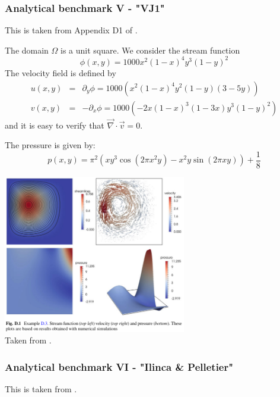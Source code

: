 \subsubsection{Analytical benchmark V \label{mms5} - "VJ1"}

This is taken from Appendix D1 of \cite{john16}.

The domain $\Omega$ is a unit square. We consider the stream function
\[
\phi(x,y)=1000x^2(1-x)^4y^3(1-y)^2
\]
The velocity field is defined by
\begin{eqnarray}
u(x,y) &=&  \partial_y \phi = 1000(x^2(1-x)^4 y^2 (1-y)(3-5y)  ) \\
v(x,y) &=& -\partial_x \phi = 1000(-2x(1-x)^3(1-3x)y^3(1-y)^2)
\end{eqnarray}
and it is easy to verify that $\vec\nabla\cdot\vec v=0$.

The pressure is given by:
\[
p(x,y)=\pi^2( xy^3\cos(2\pi x^2y) - x^2y \sin(2\pi xy)) + \frac{1}{8}
\]

\begin{center}
\includegraphics[width=8cm]{images/mms/mms5}\\
Taken from \cite{john16}.
\end{center}

\bscthesis {}

\subsubsection{Analytical benchmark VI \label{mms6} - "Ilinca \& Pelletier"}
 

This is taken from \cite{ilpe07}.

